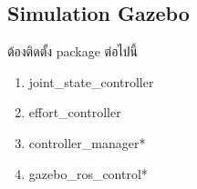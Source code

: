 \subsection{Simulation Gazebo}
ต้องติดตั้ง package ต่อไปนี้


\begin{enumerate}[label=\arabic*, leftmargin=1.5cm]
	\item joint\_state\_controller
	\item effort\_controller
	\item controller\_manager*
	\item gazebo\_ros\_control*
\end{enumerate}
